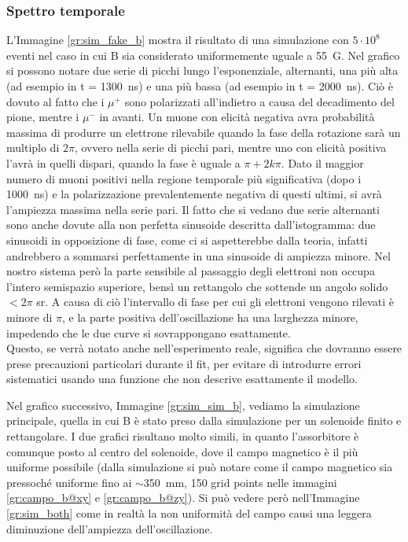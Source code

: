 \subsubsection{Spettro temporale}
L'Immagine \ref{gr:sim_fake_b} mostra il risultato di una simulazione con $5\cdot 10^8$ eventi nel caso in cui B sia considerato uniformemente uguale a 55~G. Nel grafico si possono notare due serie di picchi lungo l'esponenziale, alternanti, una più alta (ad esempio in t = 1300~ns) e una più bassa (ad esempio in t = 2000~ns). Ci\`o \`e dovuto al fatto che i $\mu^+$ sono polarizzati all'indietro a causa del decadimento del pione, mentre i $\mu^-$ in avanti. Un muone con elicit\`a negativa avra probabilit\`a massima di produrre un elettrone rilevabile quando la fase della rotazione sar\`a un multiplo di $2\pi$, ovvero nella serie di picchi pari, mentre uno con elicit\`a positiva l'avr\`a in quelli dispari, quando la fase \`e uguale a $\pi+2k\pi$. Dato il maggior numero di muoni positivi nella regione temporale pi\`u significativa (dopo i 1000~ns) e la polarizzazione prevalentemente negativa di questi ultimi, si avr\`a l'ampiezza massima nella serie pari. Il fatto che si vedano due serie alternanti sono anche dovute alla non perfetta sinusoide descritta dall'istogramma: due sinusoidi in opposizione di fase, come ci si aspetterebbe dalla teoria, infatti andrebbero a sommarsi perfettamente in una sinusoide di ampiezza minore. Nel nostro sistema per\`o la parte sensibile al passaggio degli elettroni non occupa l'intero semispazio superiore, bens\`i un rettangolo che sottende un angolo solido $<2\pi$ sr. A causa di ci\`o l'intervallo di fase per cui gli elettroni vengono rilevati \`e minore di $\pi$, e la parte positiva dell'oscillazione ha una larghezza minore, impedendo che le due curve si sovrappongano esattamente.\\
Questo, se verr\`a notato anche nell'esperimento reale, significa che dovranno essere prese precauzioni particolari durante il fit, per evitare di introdurre errori sistematici usando una funzione che non descrive esattamente il modello. 

Nel grafico successivo, Immagine \ref{gr:sim_sim_b}, vediamo la simulazione principale, quella in cui B \`e stato preso dalla simulazione per un solenoide finito e rettangolare. I due grafici risultano molto simili, in quanto l'assorbitore \`e comunque posto al centro del solenoide, dove il campo magnetico \`e il pi\`u uniforme possibile (dalla simulazione si pu\`o notare come il campo magnetico sia pressoch\'e uniforme fino ai $\sim$350~mm, 150 grid points nelle immagini \ref{gr:campo_b@xy} e \ref{gr:campo_b@zy}). Si pu\`o vedere per\`o nell'Immagine \ref{gr:sim_both} come in realt\`a la non uniformit\`a del campo causi una leggera diminuzione dell'ampiezza dell'oscillazione.


